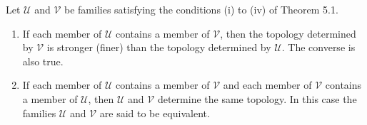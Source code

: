 Let $\mathcal{U}$ and $\mathcal{V}$ be families satisfying the conditions (i) to (iv) of Theorem 5.1.
\begin{enumerate}
\item[(a)] If each member of $\mathcal{U}$ contains a member of $\mathcal{V}$, then the topology determined by $\mathcal{V}$ is stronger (finer) than the topology determined by $\mathcal{U}$. The converse is also true.
\item[(b)] If each member of $\mathcal{U}$ contains a member of $\mathcal{V}$ and each member of $\mathcal{V}$ contains a member of $\mathcal{U}$, then $\mathcal{U}$ and $\mathcal{V}$ determine the same topology. In this case the families $\mathcal{U}$ and $\mathcal{V}$ are said to be equivalent.
\end{enumerate}
